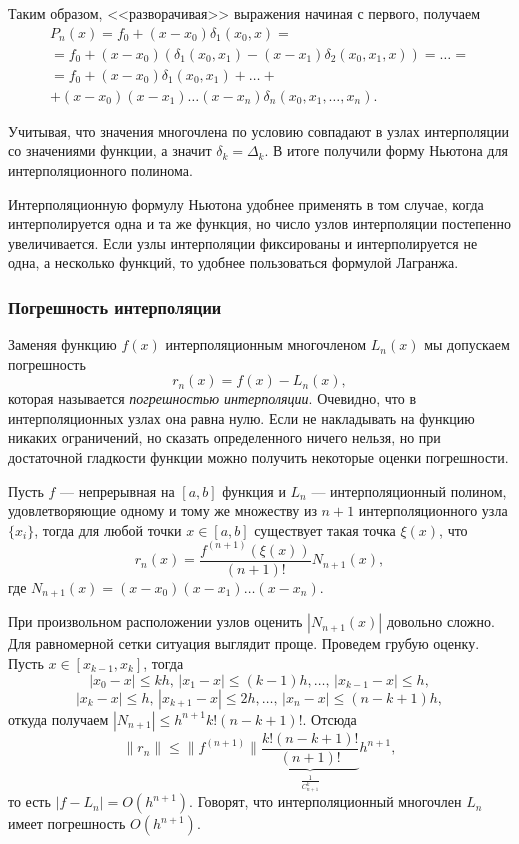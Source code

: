 Таким образом, <<разворачивая>> выражения начиная с первого, получаем
\begin{multline*}
P_{n}(x)=f_{0}+(x-x_{0})\delta_{1}(x_{0},x)=\\
=f_{0}+(x-x_{0})\left(\delta_{1}(x_{0},x_{1})-(x-x_{1})\delta_{2}(x_{0},x_{1},x)\right)=\dots=\\
=f_{0}+(x-x_{0})\delta_{1}(x_{0},x_{1})+\dots+\\
+(x-x_{0})(x-x_{1})\dots(x-x_{n})\delta_{n}(x_{0},x_{1},\dots,x_{n}).
\end{multline*}


Учитывая, что значения многочлена по условию совпадают в узлах интерполяции
со значениями функции, а значит $\delta_{k}=\Delta_{k}$. В итоге
получили форму Ньютона для интерполяционного полинома.

Интерполяционную формулу Ньютона удобнее применять в том случае, когда
интерполируется одна и та же функция, но число узлов интерполяции
постепенно увеличивается. Если узлы интерполяции фиксированы и интерполируется
не одна, а несколько функций, то удобнее пользоваться формулой Лагранжа.


\subsubsection{Погрешность интерполяции}

Заменяя функцию $f(x)$ интерполяционным многочленом $L_{n}(x)$ мы
допускаем погрешность
\[
r_{n}(x)=f(x)-L_{n}(x),
\]
которая называется \emph{погрешностью интерполяции}. Очевидно, что
в интерполяционных узлах она равна нулю. Если не накладывать на функцию
никаких ограничений, но сказать определенного ничего нельзя, но при
достаточной гладкости функции можно получить некоторые оценки погрешности.

Пусть $f$ --- непрерывная на $[a,b]$ функция и $L_{n}$ --- интерполяционный
полином, удовлетворяющие одному и тому же множеству из $n+1$ интерполяционного
узла $\{x_{i}\}$, тогда для любой точки $x\in[a,b]$ существует такая
точка $\xi(x)$, что
\[
r_{n}(x)=\frac{f^{(n+1)}\left(\xi(x)\right)}{(n+1)!}N_{n+1}(x),
\]
где $N_{n+1}(x)=(x-x_{0})(x-x_{1})\dots(x-x_{n})$.

При произвольном расположении узлов оценить $|N_{n+1}(x)|$ довольно
сложно. Для равномерной сетки ситуация выглядит проще. Проведем грубую
оценку. Пусть $x\in[x_{k-1},x_{k}]$, тогда
\[
|x_{0}-x|\leqslant kh,\,|x_{1}-x|\leqslant(k-1)h,\dots,\,|x_{k-1}-x|\leqslant h,
\]
\[
|x_{k}-x|\leqslant h,\,|x_{k+1}-x|\leqslant2h,\dots,\,|x_{n}-x|\leqslant(n-k+1)h,
\]
откуда получаем $|N_{n+1}|\leqslant h^{n+1}k!(n-k+1)!$. Отсюда
\[
\|r_{n}\|\leqslant\|f^{(n+1)}\|\underset{\frac{1}{C_{n+1}^{k}}}{\underbrace{\frac{k!(n-k+1)!}{(n+1)!}}}h^{n+1},
\]
то есть $|f-L_{n}|=O(h^{n+1})$. Говорят, что интерполяционный многочлен
$L_{n}$ имеет погрешность $O(h^{n+1})$.


